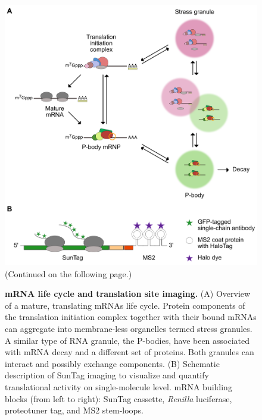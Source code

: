 \begin{figure}[b!]
    \centering
    \includegraphics[width=\linewidth]{images/figure1}
    \caption{(Continued on the following page.)}
    \label{fig:introduction}
    \end{figure}
    \addtocounter{figure}{-1}
    \begin{figure} [t!]
    \caption{\textbf{mRNA life cycle and translation site imaging.}
        (A) Overview of a mature, translating mRNAs life cycle.
            Protein components of the translation initiation complex together with their bound
            mRNAs can aggregate into membrane-less organelles termed stress granules.
            A similar type of RNA granule, the P-bodies, have been associated with mRNA
            decay and a different set of proteins.
            Both granules can interact and possibly exchange components.
        (B) Schematic description of SunTag imaging to visualize and quantify
            translational activity on single-molecule level.
            mRNA building blocks (from left to right): SunTag cassette, \textit{Renilla} luciferase, proteotuner tag, and MS2 stem-loops.
    }
\end{figure}


